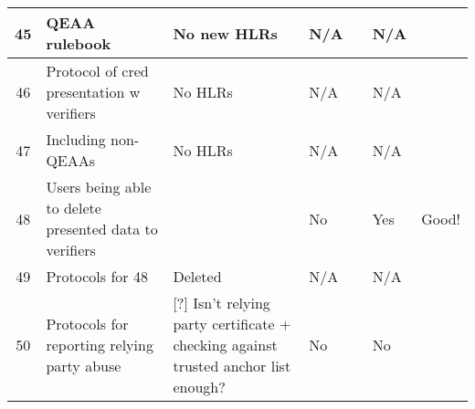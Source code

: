 \begin{longtable}{|c|p{}|p{}|p{}|p{}|p{}|p{}|}
45 & QEAA rulebook & No new HLRs & N/A & & N/A & \\
\hline

46 & Protocol of cred presentation w verifiers & No HLRs & N/A & & N/A & \\
\hline

47 & Including non-QEAAs & No HLRs & N/A & & N/A & \\
\hline

48 & Users being able to delete presented data to verifiers & & No & & Yes & Good! \\
\hline

49 & Protocols for 48 & Deleted & N/A & & N/A & \\
\hline

50 & Protocols for reporting relying party abuse & [?] Isn't relying party certificate + checking against trusted anchor list enough? & No & & No & \\
\hline

\end{longtable}